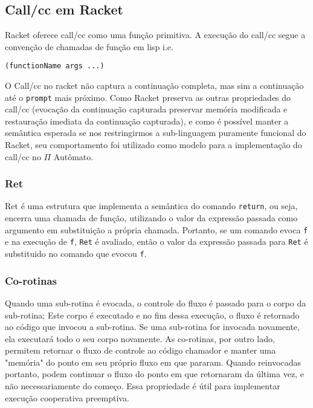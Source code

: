 \subsection{Call/cc em Racket}

Racket oferece call/cc como uma função primitiva. A execução do call/cc segue a convenção de chamadas de função em lisp i.e. 
\begin{lstlisting}
(functionName args ...)
\end{lstlisting}\cite{callccRacket}

O Call/cc no racket não captura a continuação completa, mas sim a continuação até o \texttt{prompt} mais próximo. Como Racket preserva as outras propriedades do call/cc (evocação da continuação capturada preservar memória modificada e restauração imediata da continuação capturada), e como é possível manter a semântica esperada se nos restringirmos a sub-linguagem puramente funcional do Racket, seu comportamento foi utilizado como modelo para a implementação do call/cc no $\Pi$ Autômato.
\subsubsection{Ret}
Ret é uma estrutura que implementa a semântica do comando \texttt{return}, ou seja, encerra uma chamada de função, utilizando o valor da expressão passada como argumento em substituição a própria chamada. Portanto, se um comando evoca \texttt{f} e na execução de \texttt{f}, \texttt{Ret} é avaliado, então o valor da expressão passada para \texttt{Ret} é substituido no comando que evocou \texttt{f}.

\subsubsection{Co-rotinas}
Quando uma sub-rotina é evocada, o controle do fluxo é passado para o corpo da sub-rotina; Este corpo é executado e no fim dessa execução, o fluxo é retornado ao código que invocou a sub-rotina. Se uma sub-rotina for invocada novamente, ela executará todo o seu corpo novamente. As co-rotinas, por outro lado, permitem retornar o fluxo de controle ao código chamador e manter uma "memória" do ponto em seu próprio fluxo em que pararam. Quando reinvocadas portanto, podem continuar o fluxo do ponto em que retornaram da última vez, e  não necessariamente do começo. Essa propriedade é útil para implementar execução cooperativa preemptiva.